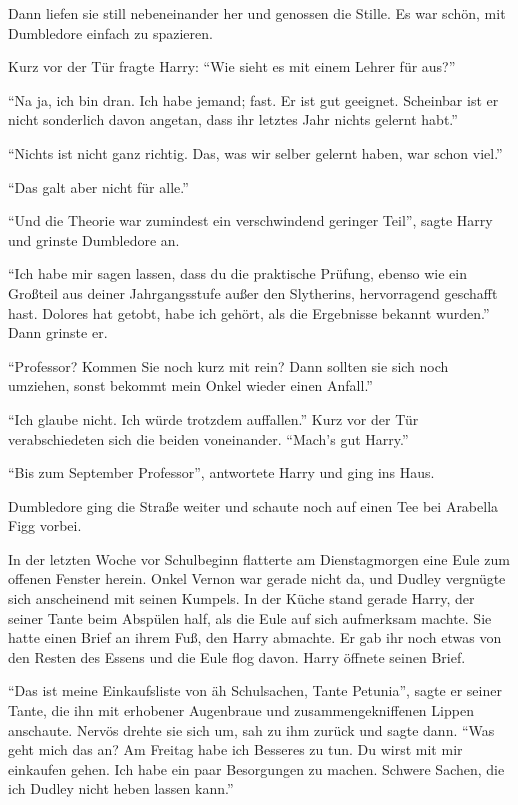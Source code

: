Dann liefen sie still nebeneinander her und genossen die Stille. Es war schön, mit Dumbledore einfach zu spazieren.

Kurz vor der Tür fragte Harry: \enquote{Wie sieht es mit einem Lehrer für \VgddK aus?}

\enquote{Na ja, ich bin dran. Ich habe jemand; fast. Er ist gut geeignet. Scheinbar ist er nicht sonderlich davon angetan, dass ihr letztes Jahr nichts gelernt habt.}

\enquote{Nichts ist nicht ganz richtig. Das, was wir selber gelernt haben, war schon viel.}

\enquote{Das galt aber nicht für alle.}

\enquote{Und die Theorie war zumindest ein verschwindend geringer Teil}, sagte Harry und grinste Dumbledore an.

\enquote{Ich habe mir sagen lassen, dass du die praktische Prüfung, ebenso wie ein Großteil aus deiner Jahrgangsstufe außer den Slytherins, hervorragend geschafft hast. Dolores hat getobt, habe ich gehört, als die Ergebnisse bekannt wurden.} Dann grinste er.

\enquote{Professor? Kommen Sie noch kurz mit rein? Dann sollten sie sich noch umziehen, sonst bekommt mein Onkel wieder einen Anfall.}

\enquote{Ich glaube nicht. Ich würde trotzdem auffallen.} Kurz vor der Tür verabschiedeten sich die beiden voneinander. \enquote{Mach’s gut Harry.}

\enquote{Bis zum September Professor}, antwortete Harry und ging ins Haus.

Dumbledore ging die Straße weiter und schaute noch auf einen Tee bei Arabella Figg vorbei.

\trenn

In der letzten Woche vor Schulbeginn flatterte am Dienstagmorgen eine Eule zum offenen Fenster herein. Onkel Vernon war gerade nicht da, und Dudley vergnügte sich anscheinend mit seinen Kumpels. In der Küche stand gerade Harry, der seiner Tante beim Abspülen half, als die Eule auf sich aufmerksam machte. Sie hatte einen Brief an ihrem Fuß, den Harry abmachte. Er gab ihr noch etwas von den Resten des Essens und die Eule flog davon. Harry öffnete seinen Brief.

\enquote{Das ist meine Einkaufsliste von \gst äh \gst Schulsachen, Tante Petunia}, sagte er seiner Tante, die ihn mit erhobener Augenbraue und zusammengekniffenen Lippen anschaute. Nervös drehte sie sich um, sah zu ihm zurück und sagte dann. \enquote{Was geht mich das an? Am Freitag habe ich Besseres zu tun. Du wirst mit mir einkaufen gehen. Ich habe ein paar Besorgungen zu machen. Schwere Sachen, die ich Dudley nicht heben lassen kann.}

